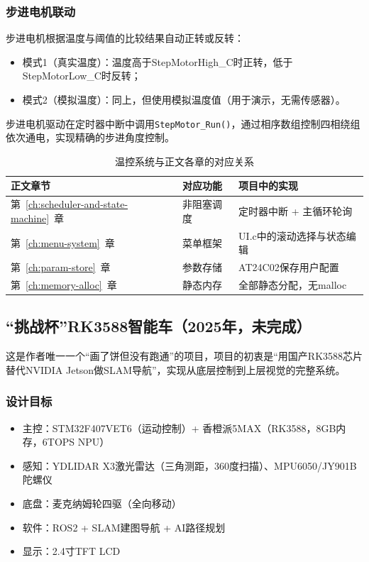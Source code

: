 \subsubsection{步进电机联动}

步进电机根据温度与阈值的比较结果自动正转或反转：

\begin{itemize}
	\item 模式1（真实温度）：温度高于StepMotorHigh\_C时正转，低于StepMotorLow\_C时反转；
	\item 模式2（模拟温度）：同上，但使用模拟温度值（用于演示，无需传感器）。
\end{itemize}

步进电机驱动在定时器中断中调用\texttt{StepMotor\_Run()}，通过相序数组控制四相绕组依次通电，实现精确的步进角度控制。

\begin{table}[htbp]
	\centering
	\caption{温控系统与正文各章的对应关系}
	\label{tab:app-temp-mapping}
	\begin{tabular}{lll}
		\toprule
		正文章节 & 对应功能 & 项目中的实现 \\
		\midrule
		第~\ref{ch:scheduler-and-state-machine}~章 & 非阻塞调度 & 定时器中断 + 主循环轮询 \\
		第~\ref{ch:menu-system}~章 & 菜单框架 & UI.c中的滚动选择与状态编辑 \\
		第~\ref{ch:param-store}~章 & 参数存储 & AT24C02保存用户配置 \\
		第~\ref{ch:memory-alloc}~章 & 静态内存 & 全部静态分配，无malloc \\
		\bottomrule
	\end{tabular}
\end{table}


\subsection{“挑战杯”RK3588智能车（2025年，未完成）}

这是作者唯一一个“画了饼但没有跑通”的项目，项目的初衷是“用国产RK3588芯片替代NVIDIA Jetson做SLAM导航”，实现从底层控制到上层视觉的完整系统。

\subsubsection{设计目标}

\begin{itemize}
	\item 主控：STM32F407VET6（运动控制）+ 香橙派5MAX（RK3588，8GB内存，6TOPS NPU）
	\item 感知：YDLIDAR X3激光雷达（三角测距，360度扫描）、MPU6050/JY901B陀螺仪
	\item 底盘：麦克纳姆轮四驱（全向移动）
	\item 软件：ROS2 + SLAM建图导航 + AI路径规划
	\item 显示：2.4寸TFT LCD
\end{itemize}

